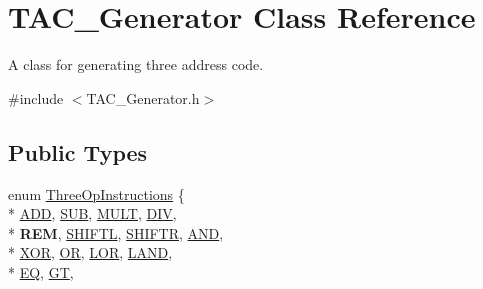 \hypertarget{classTAC__Generator}{\section{T\-A\-C\-\_\-\-Generator Class Reference}
\label{classTAC__Generator}
}


A class for generating three address code.  




{\ttfamily \#include $<$T\-A\-C\-\_\-\-Generator.\-h$>$}

\subsection*{Public Types}
\begin{DoxyCompactItemize}
\item 
enum \hyperlink{classTAC__Generator_ae032b80a215a10604c5273b65e7dab4c}{Three\-Op\-Instructions} \{ \\*
\hyperlink{classTAC__Generator_ae032b80a215a10604c5273b65e7dab4ca53bbfc51b0f492dff408d99b0a5c6f1d}{A\-D\-D}, 
\hyperlink{classTAC__Generator_ae032b80a215a10604c5273b65e7dab4caf421605e870566ed803e041ea63fc13e}{S\-U\-B}, 
\hyperlink{classTAC__Generator_ae032b80a215a10604c5273b65e7dab4ca234829d251fa1caafaf0ccf335d78ffd}{M\-U\-L\-T}, 
\hyperlink{classTAC__Generator_ae032b80a215a10604c5273b65e7dab4caa5cb29c4a931157bf020a435ef6dc346}{D\-I\-V}, 
\\*
{\bfseries R\-E\-M}, 
\hyperlink{classTAC__Generator_ae032b80a215a10604c5273b65e7dab4ca8f0f0d5e222181f2f8ad11c2931d394f}{S\-H\-I\-F\-T\-L}, 
\hyperlink{classTAC__Generator_ae032b80a215a10604c5273b65e7dab4ca0951cdfa8367ee31aa9931730f83a4e4}{S\-H\-I\-F\-T\-R}, 
\hyperlink{classTAC__Generator_ae032b80a215a10604c5273b65e7dab4ca29575c6deceddbe9671ce057c5bd4642}{A\-N\-D}, 
\\*
\hyperlink{classTAC__Generator_ae032b80a215a10604c5273b65e7dab4cae52671223b919ce023d3420e73a584b2}{X\-O\-R}, 
\hyperlink{classTAC__Generator_ae032b80a215a10604c5273b65e7dab4caa226acca7b8906c2f8f75d0b98b0e250}{O\-R}, 
\hyperlink{classTAC__Generator_ae032b80a215a10604c5273b65e7dab4cab7b80d7089fce61cef59a8fdd8513f3e}{L\-O\-R}, 
\hyperlink{classTAC__Generator_ae032b80a215a10604c5273b65e7dab4ca244997da92189ff1177adb4b588bbd0d}{L\-A\-N\-D}, 
\\*
\hyperlink{classTAC__Generator_ae032b80a215a10604c5273b65e7dab4cae55b5fefe55fa315a7bfc907f7296e12}{E\-Q}, 
\hyperlink{classTAC__Generator_ae032b80a215a10604c5273b65e7dab4ca50995cde5e40db12afecc6f687c4f503}{G\-T}, 

\end{DoxyCompactItemize}
